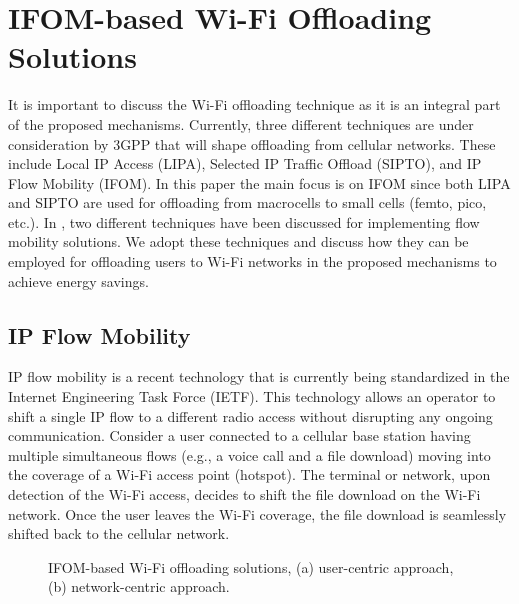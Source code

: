 \documentclass[journal]{IEEEtran}
\begin{document}
\section{IFOM-based Wi-Fi Offloading Solutions}
It is important to discuss the Wi-Fi offloading technique as it is an integral part of the proposed mechanisms. Currently, three different techniques are under consideration by 3GPP that will shape offloading from cellular networks. These include Local IP Access (LIPA), Selected IP Traffic Offload (SIPTO), and IP Flow Mobility (IFOM). In this paper the main focus is on IFOM since both LIPA and SIPTO are used for offloading from macrocells to small cells (femto, pico, etc.). In \cite{IFOM}, two different techniques have been discussed for implementing flow mobility solutions. We adopt these techniques and discuss how they can be employed for offloading users to Wi-Fi networks in the proposed mechanisms to achieve energy savings. 

\subsection{IP Flow Mobility}


IP flow mobility is a recent technology that is currently being standardized in the Internet Engineering Task Force (IETF). This technology allows an operator to shift a single IP flow to a different radio access without disrupting any
ongoing communication. Consider a user connected to a cellular base station having multiple simultaneous flows (e.g., a voice call and a file download) moving into the coverage of a Wi-Fi access point (hotspot). The terminal or network, upon detection of the Wi-Fi access, decides to shift the file download on the Wi-Fi network. Once the user leaves the Wi-Fi coverage, the file
download is seamlessly shifted back to the cellular network. 





\begin{figure*}
\centering
{} \qquad
{}
\caption{IFOM-based Wi-Fi offloading solutions, (a) user-centric approach, (b) network-centric approach.}
\label{IFOM_soln}
\end{figure*}
\end{document}
